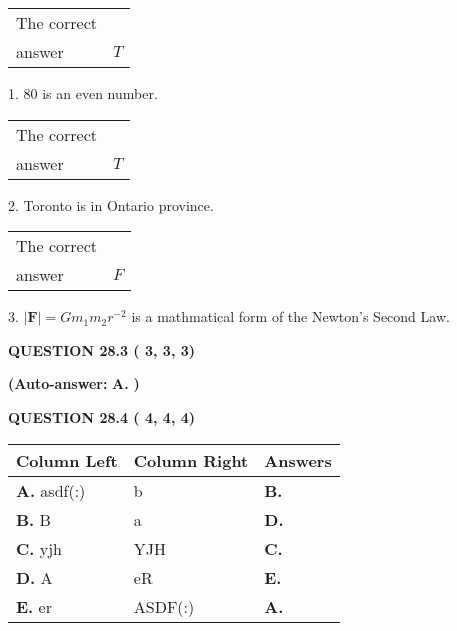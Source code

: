 \documentclass[12pt]{article}
\begin{document}
 
\noindent\begin{tabular}{|l|l|}\hline The correct & \\
          answer &  %
$T$ \\ \hline \end{tabular}
1. $ %
80$ is an  %
even number.
 
\noindent\begin{tabular}{|l|l|}\hline The correct & \\
          answer &  %
$T$ \\ \hline \end{tabular}
2.  %
Toronto is in  %
Ontario province.
 
\noindent\begin{tabular}{|l|l|}\hline The correct & \\
          answer &  %
$F$ \\ \hline \end{tabular}
3.  %
$\left| \mathbf{F}\right| =Gm_1m_2r^{-2}$ is a mathmatical form of  %
the Newton's Second Law.
 
  
  
{\textbf{\large{QUESTION
28.3 
 (          3,          3,          3)
}}}
 
 
{\textbf{(Auto-answer:}}
{\textbf{\large{
A.}}}
{\textbf{)}}
 
 
  
  
{\textbf{\large{QUESTION
28.4 
 (          4,          4,          4)
}}}
 
 
\noindent{}
  
  
\begin{tabular}{|l|l|l|}
 \hline
 Column Left & Column Right  & Answers       \\ 
 \hline
{\textbf{\large{
A.}}}
asdf(:)
  & 
b
 & 
{\textbf{\large{
B.}}}
 \\ 
 \hline
{\textbf{\large{
B.}}}
B
  & 
a
 & 
{\textbf{\large{
D.}}}
 \\ 
 \hline
{\textbf{\large{
C.}}}
yjh
  & 
YJH
 & 
{\textbf{\large{
C.}}}
 \\ 
 \hline
{\textbf{\large{
D.}}}
A
  & 
eR
 & 
{\textbf{\large{
E.}}}
 \\ 
 \hline
{\textbf{\large{
E.}}}
er
  & 
ASDF(:)
 & 
{\textbf{\large{
A.}}}
 \\ 
 \hline
 \end{tabular}
  
  
\noindent{}
 
\end{document}
